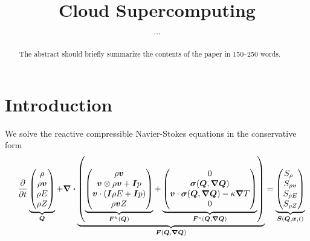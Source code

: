 \documentclass[runningheads]{llncs}
\title{Cloud Supercomputing}
\author{$\ldots$}
\institute{$\ldots$}
\newcommand{\eqA}{}
\newcommand{\eqB}{(}
\newcommand{\eqMultiA}{(}
\newcommand{\eqMultiB}{)}
\DeclareRobustCommand{\pcrefSingle}[1]{%
\begingroup%
  \renewcommand{\eqA}{(}\renewcommand{\eqB}{}%
\cref{#1}%
\endgroup%
}
\DeclareRobustCommand{\pcrefMulti}[1]{%
\begingroup%
    \renewcommand{\eqMultiA}{}\renewcommand{\eqMultiB}{}%
    (\cref{#1})%
\endgroup%
}
\DeclareRobustCommand{\pcref}[1]{%
\IfSubStr{#1}{,}{\pcrefMulti{#1}}{\pcrefSingle{#1}}%
}
\begin{document}
\maketitle
\begin{abstract}
The abstract should briefly summarize the contents of the paper in
150--250 words.

\end{abstract}
\section{Introduction}
\newcommand{\diffCoeff}{\varepsilon}
\newcommand{\hyperFluxDef}{
  \begin{pmatrix}
    \Qj \\
    \Qv  \otimes \Qj + \bm{I} \pressure  \\
    \Qv \cdot (\bm{I} \QE + \bm{I} \pressure) \\
    \Qj \QZZ
  \end{pmatrix}
}
\newcommand{\viscFluxDef}{
  \begin{pmatrix}
    0\\
     \stressT (\Q, \gradQ)  \\
     \Qv \cdot \stressT (\Q, \gradQ) - \kappa \gradient{T}\\
     0\\
   \end{pmatrix}
}%
We solve the reactive compressible Navier-Stokes equations in the conservative form%
\begin{equation}
 \label{eq:equation-set} 
\quad
  \pdv{}{t}
  \underbrace{
  \begin{pmatrix}
    \Qrho\\
    \Qj\\
    \QE\\
    \QZ
    \end{pmatrix}}_{\Q}
  +
  \divergence{
  \underbrace{
  \left(
   \underbrace{\hyperFluxDef}_{\hyperFlux(\Q)}
+
\underbrace{\viscFluxDef}_{\viscFlux(\Q, \gradQ)}
  \right)}_{\flux(\Q, \gradQ)}}
 =
  \underbrace{
  \begin{pmatrix}
    \source[\Qrho\phantom{\Qrho}]\\
    \source[\Qj]\\
    \source[\QE]\\
    \source[\QZ]
    \end{pmatrix}}_{\source(\Q, \bm{x}, t)}
\end{equation}
\end{document}
